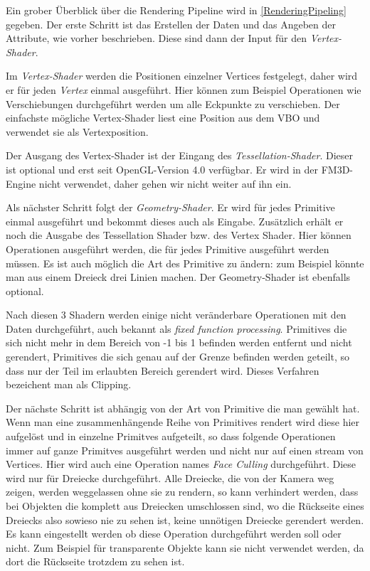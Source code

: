 Ein grober Überblick über die Rendering Pipeline wird in \cref{RenderingPipeling} gegeben. Der erste Schritt ist das Erstellen der Daten und das Angeben der Attribute, wie vorher beschrieben. Diese sind dann der Input für den \textit{Vertex-Shader}. 

Im \textit{Vertex-Shader} werden die Positionen einzelner Vertices festgelegt, daher wird er für jeden \textit{Vertex} einmal ausgeführt. Hier können zum Beispiel Operationen wie Verschiebungen durchgeführt werden um alle Eckpunkte zu verschieben. Der einfachste mögliche Vertex-Shader liest eine Position aus dem \ac{VBO} und verwendet sie als Vertexposition. 

Der Ausgang des Vertex-Shader ist der Eingang des \textit{Tessellation-Shader}. Dieser ist optional und erst seit OpenGL-Version 4.0 verfügbar. Er wird in der FM3D-Engine nicht verwendet, daher gehen wir nicht weiter auf ihn ein. 

Als nächster Schritt folgt der \textit{Geometry-Shader}. Er wird für jedes Primitive einmal ausgeführt und bekommt dieses auch als Eingabe. Zusätzlich erhält er noch die Ausgabe des Tessellation Shader bzw. des Vertex Shader. Hier können Operationen ausgeführt werden, die für jedes Primitive ausgeführt werden müssen. Es ist auch möglich die Art des Primitive zu ändern: zum Beispiel könnte man aus einem Dreieck drei Linien machen. Der Geometry-Shader ist ebenfalls optional.

Nach diesen 3 Shadern werden einige nicht veränderbare Operationen mit den Daten durchgeführt, auch bekannt als \textit{fixed function processing}. Primitives die sich nicht mehr in dem Bereich von -1 bis 1 befinden werden entfernt und nicht gerendert, Primitives die sich genau auf der Grenze befinden werden geteilt, so dass nur der Teil im erlaubten Bereich gerendert wird. Dieses Verfahren bezeichent man als Clipping.

Der nächste Schritt ist abhängig von der Art von Primitive die man gewählt hat. Wenn man eine zusammenhängende Reihe von Primitives rendert wird diese hier aufgelöst und in einzelne Primitves aufgeteilt, so dass folgende Operationen immer auf ganze Primitves ausgeführt werden und nicht nur auf einen stream von Vertices. Hier wird auch eine Operation names \textit{Face Culling} durchgeführt. Diese wird nur für Dreiecke durchgeführt. Alle Dreiecke, die von der Kamera weg zeigen, werden weggelassen ohne sie zu rendern, so kann verhindert werden, dass bei Objekten die komplett aus Dreiecken umschlossen sind, wo die Rückseite eines Dreiecks also sowieso nie zu sehen ist, keine unnötigen Dreiecke gerendert werden. Es kann eingestellt werden ob diese Operation durchgeführt werden soll oder nicht. Zum Beispiel für transparente Objekte kann sie nicht verwendet werden, da dort die Rückseite trotzdem zu sehen ist.

